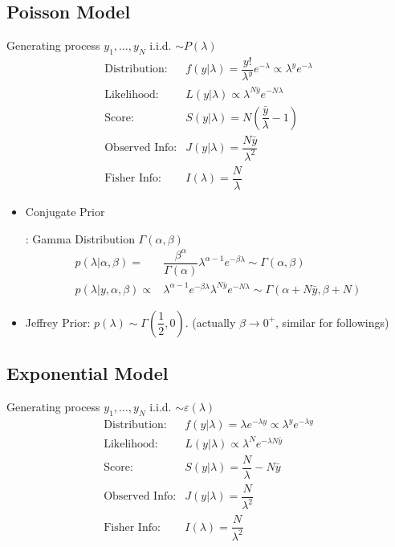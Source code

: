\subsection{Poisson Model}\label{SubSubSectionBayesianPoisson}
Generating process $ y_1,\ldots,y_N $ i.i.d. $ \sim P(\lambda ) $
\begin{align}
    \text{Distribution:}&f(y|\lambda )=\dfrac{y!}{\lambda ^y}e^{-\lambda }\propto\lambda ^ye^{-\lambda }\\
    \text{Likelihood:}&L(y|\lambda )\propto \lambda^{N\bar{y}}e^{-N\lambda } \\
    \text{Score:}&S(y|\lambda )=N(\dfrac{\bar{y}}{\lambda }-1)\\
    \text{Observed Info:}&J(y|\lambda )=\dfrac{N\bar{y}}{\lambda^2 }\\
    \text{Fisher Info:}&I(\lambda )=\dfrac{N}{\lambda }
\end{align}


\begin{itemize}[topsep=2pt,itemsep=0pt]
    \item \hypertarget{PoissonConjugate}{Conjugate Prior}: Gamma Distribution $ \Gamma (\alpha ,\beta  ) $
    \begin{align}
        p(\lambda|\alpha ,\beta  )=&\dfrac{ \beta ^\alpha   }{ \Gamma (\alpha ) }\lambda ^{\alpha -1}e^{-\beta  \lambda }\sim \Gamma (\alpha ,\beta  )\\
        p(\lambda |y,\alpha ,\beta )\propto&\lambda ^{\alpha -1}e^{-\beta  \lambda }\lambda ^{N\bar{y}}e^{-N\lambda }\sim \Gamma (\alpha +N\bar{y}, \beta +N)
    \end{align}

    \item Jeffrey Prior: $ p(\lambda )\sim \Gamma (\dfrac{ 1 }{ 2 } ,0) $. (actually $ \beta \to 0^+ $, similar for followings)
\end{itemize}

    






\subsection{Exponential Model}\label{SubSubSectionBayesianExp}

Generating process $ y_1,\ldots,y_N $ i.i.d. $ \sim \varepsilon (\lambda ) $
\begin{align}
    \text{Distribution:}&f(y|\lambda )=\lambda e^{-\lambda y}\propto\lambda ^ye^{-\lambda y }\\
    \text{Likelihood:}&L(y|\lambda )\propto \lambda^{N}e^{-\lambda N\bar{y} } \\
    \text{Score:}&S(y|\lambda )=\dfrac{N}{\lambda }-N\bar{y}\\
    \text{Observed Info:}&J(y|\lambda )=\dfrac{N}{\lambda^2 }\\
    \text{Fisher Info:}&I(\lambda )=\dfrac{N}{\lambda^2 }
\end{align}

